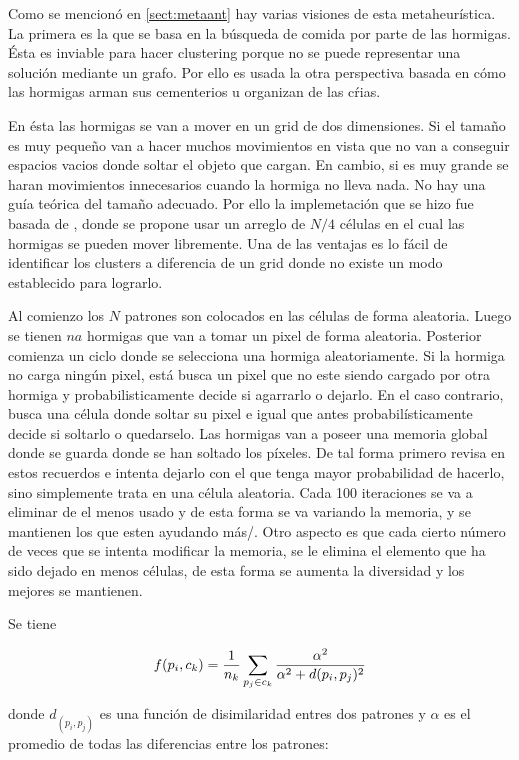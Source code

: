 Como se mencion\'o en \ref{sect:metaant} hay varias visiones de esta metaheur\'istica.
La primera es la que se basa en la b\'usqueda de comida por parte de las hormigas.
\'Esta es inviable para hacer clustering porque no se puede representar 
una soluci\'on mediante un grafo. Por ello es usada la otra perspectiva basada en c\'omo
las hormigas arman sus cementerios u organizan de las c\'rias. 

En \'esta las hormigas se van a mover en un grid de dos dimensiones. Si 
el tama\~no es muy peque\~no van a hacer muchos movimientos en vista que
no van a conseguir espacios vacios donde soltar el objeto que cargan. En cambio,
si es muy grande se haran movimientos innecesarios cuando la hormiga no lleva nada.
No hay una gu\'ia te\'orica del tama\~no adecuado. Por ello la implemetaci\'on que
se hizo fue basada de \cite{OuBa2007}, donde se propone usar un arreglo 
de $N/4$ c\'elulas en el cual las hormigas se pueden mover libremente.
Una de las ventajas es lo f\'acil de identificar los clusters a diferencia
de un grid donde no existe un modo establecido para lograrlo.

Al comienzo los $N$ patrones son colocados
en las c\'elulas de forma aleatoria. Luego se tienen $na$ hormigas que van a tomar
un pixel de forma aleatoria. Posterior comienza un ciclo donde se selecciona una hormiga
aleatoriamente. Si la hormiga no carga ning\'un pixel, est\'a busca un pixel
que no este siendo cargado por otra hormiga y probabilisticamente decide si agarrarlo o dejarlo.
En el caso contrario, busca una c\'elula donde soltar su pixel e igual que antes
probabil\'isticamente decide si soltarlo o quedarselo. Las hormigas van a poseer
una memoria global donde se guarda donde se han soltado los p\'ixeles.
De tal forma primero revisa en estos recuerdos e intenta dejarlo con el que tenga 
mayor probabilidad de hacerlo, sino simplemente trata en una c\'elula
aleatoria. Cada 100 iteraciones se va a eliminar de
el menos usado y de esta forma se va variando la memoria, y se mantienen los que
esten ayudando m\'as/. Otro aspecto es que cada cierto n\'umero de veces que
se intenta modificar la memoria, se le elimina el elemento que ha sido dejado en menos c\'elulas,
de esta forma se aumenta la diversidad y los mejores se mantienen.

Se tiene

\[
f(p_i,c_k) = {1 \over n_k} \sum_{p_j \in c_k} {\alpha^2 \over {\alpha^2 + d(p_i,p_j)^2}}
\]

donde $d_(p_i,p_j)$ es una funci\'on de disimilaridad
entres dos patrones y $\alpha$ es el promedio de todas
las diferencias entre los patrones:

